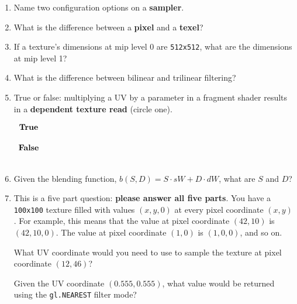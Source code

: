 \documentclass[11pt]{article}
\begin{document}
\begin{enumerate}[start=0]
\item Name two configuration options on a \textbf{sampler}.
\vspace*{25px}

\item What is the difference between a \textbf{pixel} and a \textbf{texel}?
\vspace*{25px}

\item If a texture's dimensions at mip level 0 are \texttt{512x512}, what are the dimensions at mip level 1?
\vspace*{25px}

\item What is the difference between bilinear and trilinear filtering?
\vspace*{25px}

\item True or false: multiplying a UV by a parameter in a fragment shader results in a \textbf{dependent texture read} (circle one).
\begin{center}
$%
\begin{array}{ccccc}
\textbf{True}
\\
\vspace*{1px}
\\
\textbf{False}
\\
\vspace*{1px}
\\
\end{array}%
$
\end{center}

\item Given the blending function, $b(S, D) = S \cdot sW + D \cdot dW$, what are $S$ and $D$?
\vspace*{25px}

\newpage

\item This is a five part question: \textbf{please answer all five parts}. You have a \texttt{100x100} texture filled with values $(x, y, 0)$ at every pixel coordinate $(x, y)$. For example, this means that the value at pixel coordinate $(42, 10)$ is $(42, 10, 0)$. The value at pixel coordinate $(1, 0)$ is $(1, 0, 0)$, and so on. 
\vspace*{15px}

What UV coordinate would you need to use to sample the texture at pixel coordinate $(12, 46)$?
\vspace*{55px}

Given the UV coordinate $(0.555, 0.555)$, what value would be returned using the \texttt{gl.NEAREST} filter mode?
\vspace*{55px}


\end{enumerate}
\end{document}
